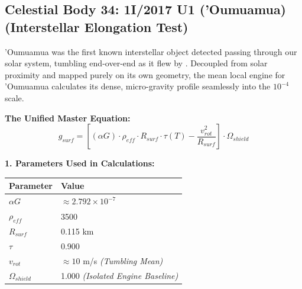 \documentclass[11pt, a4paper]{article}
\begin{document}
\clearpage
\subsection{Celestial Body 34: 1I/2017 U1 ('Oumuamua) (Interstellar Elongation Test)}
  'Oumuamua was the first known interstellar object detected passing through our solar system, tumbling end-over-end as it flew by \cite{meech2017}. Decoupled from solar proximity and mapped purely on its own geometry, the mean local engine for 'Oumuamua calculates its dense, micro-gravity profile seamlessly into the $10^{-4}$ scale.

  \vspace{0.5em}
  \noindent \textbf{The Unified Master Equation:}
  $$ g_{surf} = \left[ (\alpha G) \cdot \rho_{eff} \cdot R_{surf} \cdot \tau(T) - \frac{v_{rot}^2}{R_{surf}} \right] \cdot \Omega_{shield} $$

  \vspace{0.5em}
  \noindent \textbf{1. Parameters Used in Calculations:} \\[0.5em]
  \begingroup
  \renewcommand{\arraystretch}{1.3}
  \hspace*{2em}
  \begin{tabular}{|l|l|}
    \hline
    \textbf{Parameter} & \textbf{Value} \\ \hline
    $\alpha G$ & $\approx 2.792 \times 10^{-7}$ \\ \hline
    $\rho_{eff}$ & 3500 \\ \hline
    $R_{surf}$ & 0.115 km \\ \hline
    $\tau$ & 0.900 \\ \hline
    $v_{rot}$ & $\approx 10$ m/s \textit{(Tumbling Mean)} \\ \hline
    $\Omega_{shield}$ & 1.000 \textit{(Isolated Engine Baseline)} \\ \hline
  \end{tabular}
  \endgroup
\end{document}
